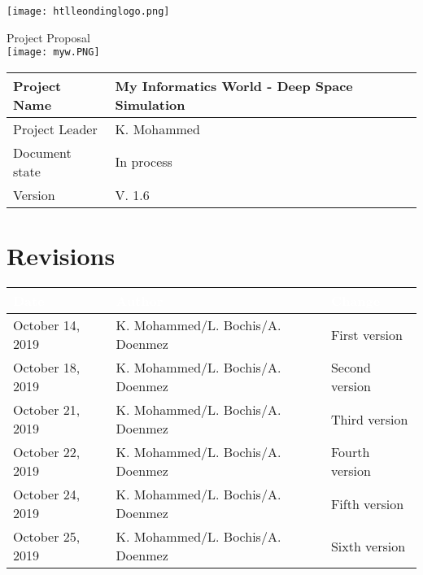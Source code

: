 \documentclass[12pt]{article}
\theoremstyle{definition}
\newcommand{\projectname}{My Informatics World - Deep Space Simulation}
\newcommand{\projectleader}{K. Mohammed}
\newcommand{\documentstatus}{In process}
\newcommand{\version}{V. 1.6}
\begin{document}
\begin{titlepage}
\begin{flushright}
\texttt{[image: htlleondinglogo.png]}\\
\end{flushright}

\vspace{10em}

\begin{center}
{\Huge Project Proposal} \\[3em]
\texttt{[image: myw.PNG]}\\
\end{center}
\hfill \break
\begin{flushleft}
\begin{tabular}{|l|l|}
\hline
Project Name & \projectname \\ \hline
Project Leader & \projectleader \\ \hline
Document state & \documentstatus \\ \hline
Version & \version \\ \hline
\end{tabular}
\end{flushleft}

\end{titlepage}
\section*{Revisions}
\begin{tabular}{|l|l|l|}
\hline
\cellcolor[gray]{0.5}\textcolor{white}{Date} & \cellcolor[gray]{0.5}\textcolor{white}{Author} & \cellcolor[gray]{0.5}\textcolor{white}{Change} \\ \hline
October 14, 2019&K. Mohammed/L. Bochis/A. Doenmez&First version \\ \hline
October 18, 2019&K. Mohammed/L. Bochis/A. Doenmez&Second version \\ \hline
October 21, 2019&K. Mohammed/L. Bochis/A. Doenmez&Third version \\ \hline
October 22, 2019&K. Mohammed/L. Bochis/A. Doenmez&Fourth version \\ \hline
October 24, 2019&K. Mohammed/L. Bochis/A. Doenmez&Fifth version \\ \hline
October 25, 2019&K. Mohammed/L. Bochis/A. Doenmez&Sixth version \\ \hline
\end{tabular}
\pagebreak

\tableofcontents
\pagebreak
\end{document}
